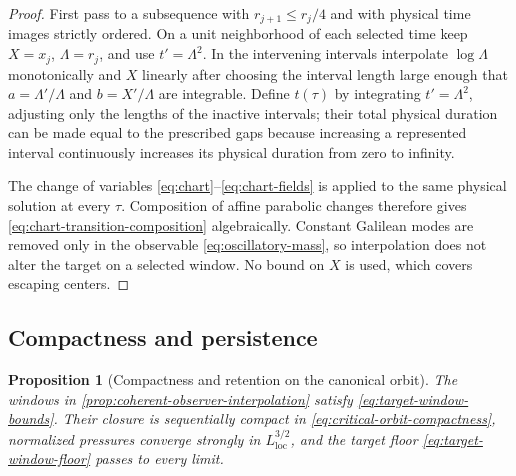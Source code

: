 \documentclass[11pt]{amsart}
\numberwithin{equation}{section}
\theoremstyle{plain}
\newtheorem{proposition}[proposition]{Proposition}
\theoremstyle{definition}
\theoremstyle{remark}
\begin{document}
\begin{proof}
First pass to a subsequence with \(r_{j+1}\le r_j/4\) and with physical time
images strictly ordered.  On a unit neighborhood of each selected time keep
\(X=x_j\), \(\Lambda=r_j\), and use \(t'=\Lambda^2\).  In the intervening
intervals interpolate \(\log\Lambda\) monotonically and \(X\) linearly after
choosing the interval length large enough that
\(a=\Lambda'/\Lambda\) and \(b=X'/\Lambda\) are integrable.  Define
\(t(\tau)\) by integrating \(t'=\Lambda^2\), adjusting only the lengths of
the inactive intervals; their total physical duration can be made equal to
the prescribed gaps because increasing a represented interval continuously
increases its physical duration from zero to infinity.

The change of variables \eqref{eq:chart}--\eqref{eq:chart-fields} is applied to the
same physical solution at every \(\tau\).  Composition of affine parabolic
changes therefore gives \eqref{eq:chart-transition-composition}
algebraically.  Constant Galilean modes are removed only in the observable
\eqref{eq:oscillatory-mass}, so interpolation does not alter the target on a
selected window.  No bound on \(X\) is used, which covers escaping centers.
\end{proof}

\subsection{Compactness and persistence}
\label{app:orbit-compactness-persistence}

\begin{proposition}[Compactness and retention on the canonical orbit]
\label{prop:canonical-orbit-compactness-retention}
The windows in \cref{prop:coherent-observer-interpolation} satisfy
\eqref{eq:target-window-bounds}.  Their closure is sequentially compact in
\eqref{eq:critical-orbit-compactness}, normalized pressures converge strongly
in \(L^{3/2}_{\mathrm{loc}}\), and the target floor
\eqref{eq:target-window-floor} passes to every limit.
\end{proposition}
\end{document}
